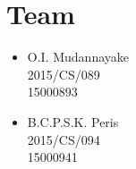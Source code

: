 \section{Team}
    \begin{itemize}
        \item O.I. Mudannayake \\ 2015/CS/089 \\ 15000893
        \item B.C.P.S.K. Peris \\ 2015/CS/094 \\ 15000941
    \end{itemize}